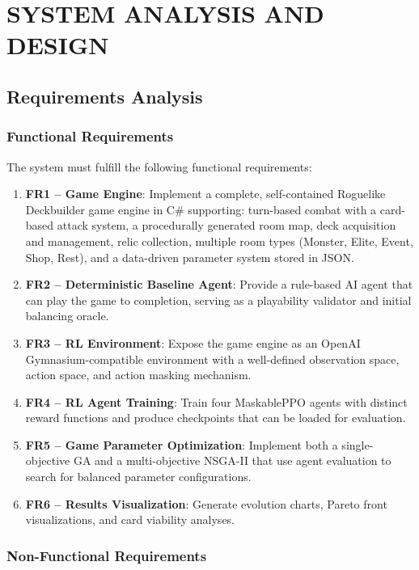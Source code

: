 \clearpage
{}
\chapter{SYSTEM ANALYSIS AND DESIGN}

\section{Requirements Analysis}

\subsection{Functional Requirements}

The system must fulfill the following functional requirements:
\begin{enumerate}
    \item \textbf{FR1 -- Game Engine}: Implement a complete, self-contained Roguelike Deckbuilder game engine in C\# supporting: turn-based combat with a card-based attack system, a procedurally generated room map, deck acquisition and management, relic collection, multiple room types (Monster, Elite, Event, Shop, Rest), and a data-driven parameter system stored in JSON.
    \item \textbf{FR2 -- Deterministic Baseline Agent}: Provide a rule-based AI agent that can play the game to completion, serving as a playability validator and initial balancing oracle.
    \item \textbf{FR3 -- RL Environment}: Expose the game engine as an OpenAI Gymnasium-compatible environment with a well-defined observation space, action space, and action masking mechanism.
    \item \textbf{FR4 -- RL Agent Training}: Train four MaskablePPO agents with distinct reward functions and produce checkpoints that can be loaded for evaluation.
    \item \textbf{FR5 -- Game Parameter Optimization}: Implement both a single-objective GA and a multi-objective NSGA-II that use agent evaluation to search for balanced parameter configurations.
    \item \textbf{FR6 -- Results Visualization}: Generate evolution charts, Pareto front visualizations, and card viability analyses.
\end{enumerate}

\subsection{Non-Functional Requirements}

